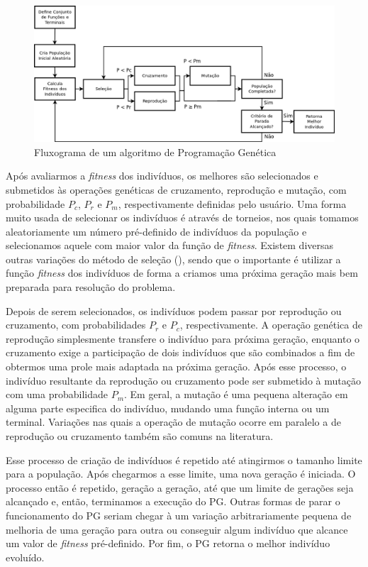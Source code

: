 \begin{figure}[t]
\centering
\includegraphics[width=1.1\textwidth]{figures/gpwf_new.png}
\caption{Fluxograma de um algoritmo de Programação Genética}
\label{fig::gpwf}
\end{figure}

Após avaliarmos a \textit{fitness} dos indivíduos, os melhores são selecionados e submetidos às operações genéticas de cruzamento, reprodução e mutação, com probabilidade $P_c$, $P_r$ e $P_m$, respectivamente definidas pelo usuário.
Uma forma muito usada de selecionar os indivíduos é através de torneios, nos quais tomamos aleatoriamente um número pré-definido de indivíduos da população e selecionamos aquele com maior valor da função de \textit{fitness}. Existem diversas outras variações do método de seleção (\cite{Koza92}), sendo que o importante é utilizar a função \textit{fitness} dos indivíduos de forma a criamos uma próxima geração mais bem preparada para resolução do problema. 

Depois de serem selecionados, os indivíduos podem passar por reprodução ou cruzamento, com probabilidades $P_r$ e $P_c$, respectivamente. 
A operação genética de reprodução simplesmente transfere o indivíduo para próxima geração, enquanto o cruzamento exige a participação de dois indivíduos que são combinados a fim de obtermos
uma prole mais adaptada na próxima geração.
Após esse processo, o indivíduo resultante da reprodução ou cruzamento pode ser submetido à mutação com uma probabilidade $P_m$.
Em geral, a mutação é uma pequena alteração em alguma parte especifica do indivíduo, mudando uma função interna ou um terminal.
Variações nas quais a operação de mutação ocorre em paralelo a de reprodução ou cruzamento também são comuns na literatura.

Esse processo de criação de indivíduos é repetido até atingirmos o tamanho limite para a população. Após chegarmos a esse limite, uma nova geração é iniciada. 
O processo então é repetido, geração a geração, até que um limite de gerações seja alcançado e, então, terminamos a execução do \textsc{PG}. 
Outras formas de parar o funcionamento do \textsc{PG} seriam chegar à um variação arbitrariamente pequena de melhoria de uma geração para outra ou conseguir algum indivíduo que alcance um valor de \textit{fitness} pré-definido. Por fim, o \textsc{PG} retorna o melhor indivíduo evoluído.

